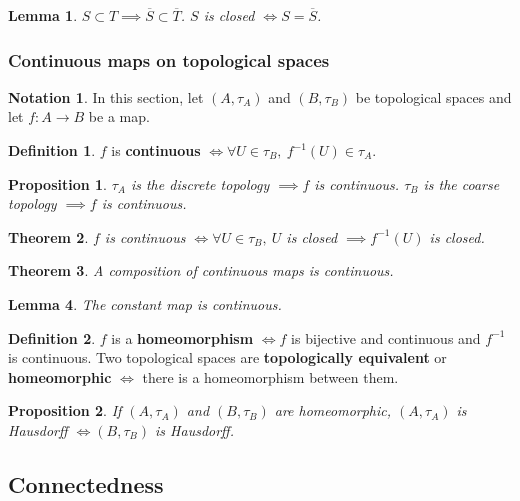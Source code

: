 \documentclass[12pt]{article}
\newtheorem{thm}{Theorem}[section]
\newtheorem{lem}[thm]{Lemma}
\newtheorem*{prop*}{Proposition}
\theoremstyle{definition}
\newtheorem{defn}{Definition}[section]
\newtheorem*{not*}{Notation}
\begin{document}
\begin{lem}
	$S \subset T \implies \overline{S} \subset \overline{T}$. $S$ is closed $\iff S = \overline{S}$.
\end{lem}

\subsubsection{Continuous maps on topological spaces}

\begin{not*}
	In this section, let $(A, \tau_A)$ and $(B, \tau_B)$ be topological spaces and let $f : A \to B$ be a map.
\end{not*}

\begin{defn}
	$f$ is \textbf{continuous} $\iff \forall U \in \tau_B,\ f^{-1}(U) \in \tau_A$.
\end{defn}

\begin{prop*}
	$\tau_A$ is the discrete topology $\implies f$ is continuous.
	$\tau_B$ is the coarse topology $\implies f$ is continuous.
\end{prop*}

\begin{thm}
	$f$ is continuous $\iff \forall U \in \tau_B,\ U$ is closed $\implies f^{-1}(U)$ is closed. 
\end{thm}

\begin{thm}
	A composition of continuous maps is continuous.
\end{thm}

\begin{lem}
	The constant map is continuous.
\end{lem}

\begin{defn}
	$f$ is a \textbf{homeomorphism} $\iff f$ is bijective and continuous and $f^{-1}$ is continuous.
	Two topological spaces are \textbf{topologically equivalent} or \textbf{homeomorphic} $\iff$ there is a homeomorphism between them.
\end{defn}

\begin{prop*}
	If $(A, \tau_A)$ and $(B, \tau_B)$ are homeomorphic, $(A, \tau_A)$ is Hausdorff $\iff (B, \tau_B)$ is Hausdorff.
\end{prop*}

\subsection{Connectedness}
\end{document}
